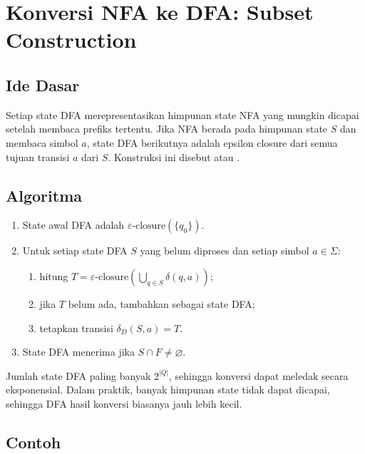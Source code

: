 \section{Konversi NFA ke DFA: Subset Construction}
\label{sec:ch06-subset}

\subsection{Ide Dasar}

Setiap state DFA merepresentasikan himpunan state NFA yang mungkin
dicapai setelah membaca prefiks tertentu. Jika NFA berada pada
himpunan state \(S\) dan membaca simbol \(a\), state DFA berikutnya
adalah epsilon closure dari semua tujuan transisi \(a\) dari \(S\).
Konstruksi ini disebut  atau
.

\subsection{Algoritma}

\begin{enumerate}[label=\arabic*.,leftmargin=*]
  \item State awal DFA adalah \(\varepsilon\text{-closure}(\{q_0\})\).
  \item Untuk setiap state DFA \(S\) yang belum diproses dan setiap
        simbol \(a \in \Sigma\):
        \begin{enumerate}[label=(\alph*),leftmargin=*]
          \item hitung \(T = \varepsilon\text{-closure}(
                \bigcup_{q \in S} \delta(q,a))\);
          \item jika \(T\) belum ada, tambahkan sebagai state DFA;
          \item tetapkan transisi \(\delta_D(S,a) = T\).
        \end{enumerate}
  \item State DFA menerima jika \(S \cap F \neq \varnothing\).
\end{enumerate}

Jumlah state DFA paling banyak \(2^{|Q|}\), sehingga konversi dapat
meledak secara eksponensial. Dalam praktik, banyak himpunan state
tidak dapat dicapai, sehingga DFA hasil konversi biasanya jauh lebih
kecil.

\subsection{Contoh}

